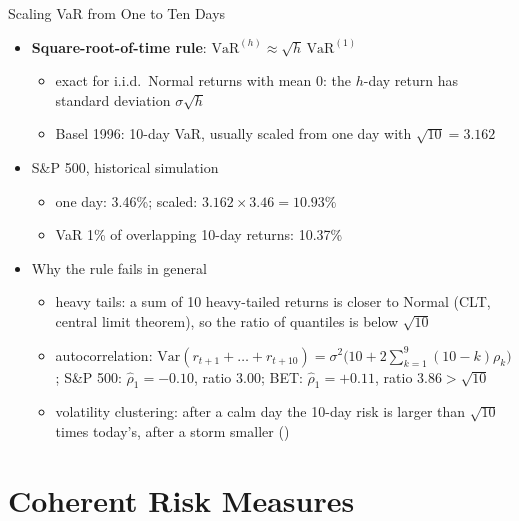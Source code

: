 \begin{frame}{Scaling VaR from One to Ten Days}
\itemsize{\footnotesize}
\begin{itemize}
    \item \textbf{Square-root-of-time rule}: $\mathrm{VaR}^{(h)} \approx \sqrt{h}\,\mathrm{VaR}^{(1)}$
    \begin{itemize}
        \item exact for i.i.d.\ Normal returns with mean 0: the $h$-day return has standard deviation $\sigma\sqrt{h}$
        \item Basel 1996: 10-day VaR, usually scaled from one day with $\sqrt{10} = 3.162$
    \end{itemize}
    \item S\&P 500, historical simulation
    \begin{itemize}
        \item one day: 3.46\%; scaled: $3.162 \times 3.46 = 10.93\%$
        \item VaR 1\% of overlapping 10-day returns: 10.37\%
    \end{itemize}
    \item Why the rule fails in general
    \begin{itemize}
        \item heavy tails: a sum of 10 heavy-tailed returns is closer to Normal (CLT, central limit theorem), so the ratio of quantiles is below $\sqrt{10}$
        \item autocorrelation: $\mathrm{Var}(r_{t+1}+\dots+r_{t+10}) = \sigma^2\bigl(10 + 2\sum_{k=1}^{9}(10-k)\rho_k\bigr)$; S\&P 500: $\hat\rho_1 = -0.10$, ratio $3.00$; BET: $\hat\rho_1 = +0.11$, ratio $3.86 > \sqrt{10}$
        \item volatility clustering: after a calm day the 10-day risk is larger than $\sqrt{10}$ times today's, after a storm smaller ()
    \end{itemize}
\end{itemize}
\end{frame}


\section{Coherent Risk Measures}


